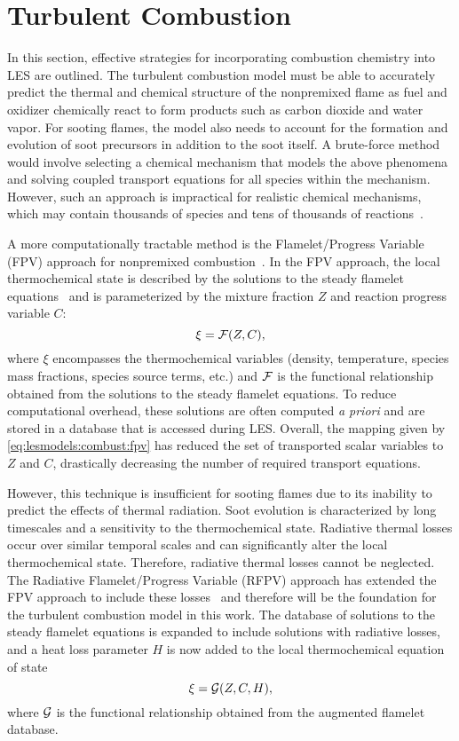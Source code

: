 \section{Turbulent Combustion}
\label{sec:lesmodels:combust}

In this section, effective strategies for incorporating combustion chemistry into LES are outlined. The turbulent combustion model must be able to accurately predict the thermal and chemical structure of the nonpremixed flame as fuel and oxidizer chemically react to form products such as carbon dioxide and water vapor. For sooting flames, the model also needs to account for the formation and evolution of soot precursors in addition to the soot itself. A brute-force method would involve selecting a chemical mechanism that models the above phenomena and solving coupled transport equations for all species within the mechanism. However, such an approach is impractical for realistic chemical mechanisms, which may contain thousands of species and tens of thousands of reactions~\cite{law2007}.

A more computationally tractable method is the Flamelet/Progress Variable (FPV) approach for nonpremixed combustion~\cite{pierce2004}. In the FPV approach, the local thermochemical state is described by the solutions to the steady flamelet equations~\cite{peters1984} and is parameterized by the mixture fraction $Z$ and reaction progress variable $C$:
\begin{equation}\label{eq:lesmodels:combust:fpv}
  \xi = \mathcal{F}(Z,C),
\end{equation}
where $\xi$ encompasses the thermochemical variables (density, temperature, species mass fractions, species source terms, etc.) and $\mathcal{F}$ is the functional relationship obtained from the solutions to the steady flamelet equations. To reduce computational overhead, these solutions are often computed \textit{a priori} and are stored in a database that is accessed during LES. Overall, the mapping given by \cref{eq:lesmodels:combust:fpv} has reduced the set of transported scalar variables to $Z$ and $C$, drastically decreasing the number of required transport equations.

However, this technique is insufficient for sooting flames due to its inability to predict the effects of thermal radiation. Soot evolution is characterized by long timescales and a sensitivity to the thermochemical state. Radiative thermal losses occur over similar temporal scales and can significantly alter the local thermochemical state. Therefore, radiative thermal losses cannot be neglected. The Radiative Flamelet/Progress Variable (RFPV) approach has extended the FPV approach to include these losses~\cite{ihme2008} and therefore will be the foundation for the turbulent combustion model in this work. The database of solutions to the steady flamelet equations is expanded to include solutions with radiative losses, and a heat loss parameter $H$ is now added to the local thermochemical equation of state
\begin{equation}\label{eq:lesmodels:combust:rfpv}
  \xi = \mathcal{G}(Z, C, H),
\end{equation}
where $\mathcal{G}$ is the functional relationship obtained from the augmented flamelet database.

